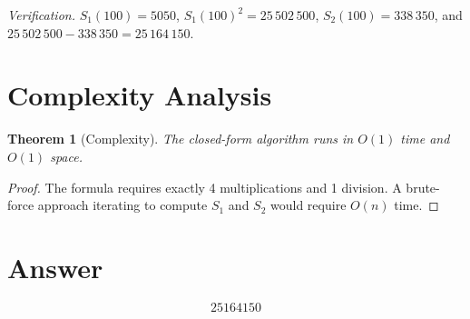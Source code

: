 \documentclass[11pt]{article}
\newtheorem{theorem}{Theorem}
\begin{document}
\emph{Verification.} $S_1(100) = 5050$, $S_1(100)^2 = 25\,502\,500$, $S_2(100) = 338\,350$, and $25\,502\,500 - 338\,350 = 25\,164\,150$.\;\checkmark

\section{Complexity Analysis}

\begin{theorem}[Complexity]
The closed-form algorithm runs in $O(1)$ time and $O(1)$ space.
\end{theorem}

\begin{proof}
The formula requires exactly 4 multiplications and 1 division. A brute-force approach iterating to compute $S_1$ and $S_2$ would require $O(n)$ time.
\end{proof}

\section{Answer}

\[
\boxed{25164150}
\]
\end{document}
